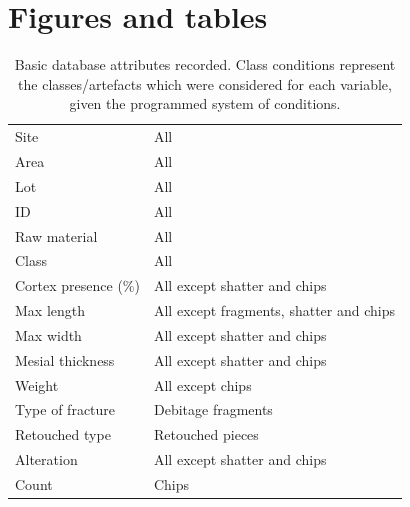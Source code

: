 \documentclass[12pt,twoside]{reedthesis}
\begin{document}
\hypertarget{figures-and-tables}{%
\chapter{Figures and tables}\label{figures-and-tables}}
\begin{table}

\caption{\label{tab:basicdb}Basic database attributes recorded. Class conditions represent the classes/artefacts which were considered for each variable, given the programmed system of conditions.}
\centering
\fontsize{9}{11}\selectfont
\begin{tabular}[t]{>{\raggedright\arraybackslash}p{5cm}>{\raggedright\arraybackslash}p{5cm}}
\toprule
\multicolumn{1}{>{\centering\arraybackslash}p{5cm}}{\textbf{Recorded variables}} & \multicolumn{1}{>{\centering\arraybackslash}p{5cm}}{\textbf{Class conditions}}\\
\midrule
Site & All\\
Area & All\\
Lot & All\\
ID & All\\
Raw material & All\\
\addlinespace
Class & All\\
Cortex presence (\%) & All except shatter and chips\\
Max length & All except fragments, shatter and chips\\
Max width & All except shatter and chips\\
Mesial thickness & All except shatter and chips\\
\addlinespace
Weight & All except chips\\
Type of fracture & Debitage fragments\\
Retouched type & Retouched pieces\\
Alteration & All except shatter and chips\\
Count & Chips\\
\bottomrule
\end{tabular}
\end{table}
\begingroup\fontsize{9}{11}\selectfont
\end{document}
